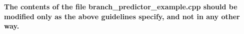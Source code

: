 \documentclass[a4paper,12pt]{article}
\newcommand\mycomment[3]{\PackageWarning{null}{There are still outstanding comments/issues from #2}\noindent{#1 {\bf \fbox{#2}} {\it#3}}}
\newcommand\boris[1]{{\color{blue}#1}}
\newcommand\vijay[1]{\mycomment{\color{magenta}}{vijay}{#1}}
\theoremstyle{plain}
\begin{document}
\textbf{The contents of the file branch\_predictor\_example.cpp should be modified only as the above guidelines specify, and not in any other way. } 



 

 


\end{document}
